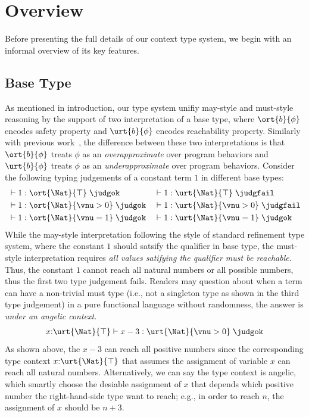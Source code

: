 \section{Overview}\label{sec:overview}

Before presenting the full details of our context type system, we begin with an informal overview of its key features.

\subsection{Base Type}

As mentioned in introduction, our type system unifiy may-style and must-style reasoning by the support of two interpretation of a base type, where $\ort{b}{\phi}$ encodes safety property and $\urt{b}{\phi}$ encodes reachability property. Similarly with previous work~\cite{CoverageType}, the difference between these two interpretations is that $\ort{b}{\phi}$ treats $\phi$ as an \emph{overapproximate} over program behaviors and $\urt{b}{\phi}$ treats $\phi$ as an \emph{underapproximate} over program behaviors. Consider the following typing judgements of a constant term $1$ in different base types:
\begin{align*}
  &\vdash 1 : \ort{\Nat}{\top}\;\judgok
  && \vdash 1 : \urt{\Nat}{\top}\;\judgfail
  \\&\vdash 1 : \ort{\Nat}{\vnu > 0}\;\judgok
  && \vdash 1 : \urt{\Nat}{\vnu > 0}\;\judgfail
  \\&\vdash 1 : \ort{\Nat}{\vnu = 1}\;\judgok
  && \vdash 1 : \urt{\Nat}{\vnu = 1}\;\judgok
\end{align*}\noindent
While the may-style interpretation following the style of standard refinement type system, where the constant $1$ should satsify the qualifier in base type, the must-style interpretation requires \emph{all values satifying the qualifier must be reachable}. Thus, the constant $1$ cannot reach all natural numbers or all possible numbers, thus the first two type judgement fails. Readers may question about when a term can have a non-trivial must type (i.e., not a singleton type as shown in the third type judgement) in a pure functional language without randomness, the answer is \emph{under an angelic context}.
\begin{align*}
  x{:}\urt{\Nat}{\top} \vdash x - 3 : \urt{\Nat}{\vnu > 0}\;\judgok
\end{align*}\noindent
As shown above, the $x - 3$ can reach all positive numbers since the corresponding type context $x{:}\urt{\Nat}{\top}$ that assumes the assignment of variable $x$ can reach all natural numbers. Alternatively, we can say the type context is angelic, which smartly choose the desiable assignment of $x$ that depends which positive number the right-hand-side type want to reach; e.g., in order to reach $n$, the assignment of $x$ should be $n + 3$. 
